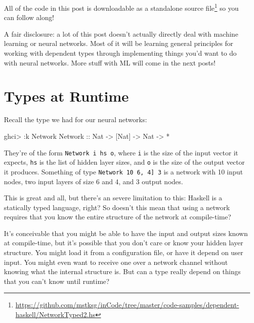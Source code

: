 \documentclass[]{article}
\newenvironment{Shaded}{}{}
\newcommand{\DataTypeTok}[1]{\textcolor[rgb]{0.56,0.13,0.00}{#1}}
\newcommand{\FunctionTok}[1]{\textcolor[rgb]{0.02,0.16,0.49}{#1}}
\newcommand{\NormalTok}[1]{#1}
\newcommand{\OtherTok}[1]{\textcolor[rgb]{0.00,0.44,0.13}{#1}}
\renewcommand{\href}[2]{#2\footnote{\url{#1}}}
\begin{document}
All of the code in this post is
\href{https://github.com/mstksg/inCode/tree/master/code-samples/dependent-haskell/NetworkTyped2.hs}{downloadable
as a standalone source file} so you can follow along!

A fair disclosure: a lot of this post doesn't actually directly deal with
machine learning or neural networks. Most of it will be learning general
principles for working with dependent types through implementing things you'd
want to do with neural networks. More stuff with ML will come in the next posts!

\hypertarget{types-at-runtime}{%
\section{Types at Runtime}\label{types-at-runtime}}

Recall the type we had for our neural networks:

\begin{Shaded}
\begin{Highlighting}[]
\NormalTok{ghci}\FunctionTok{>} \FunctionTok{:}\NormalTok{k }\DataTypeTok{Network}
\DataTypeTok{Network}\OtherTok{ ::} \DataTypeTok{Nat} \OtherTok{->}\NormalTok{ [}\DataTypeTok{Nat}\NormalTok{] }\OtherTok{->} \DataTypeTok{Nat} \OtherTok{->} \FunctionTok{*}
\end{Highlighting}
\end{Shaded}

They're of the form \texttt{Network\ i\ hs\ o}, where \texttt{i} is the size of
the input vector it expects, \texttt{hs} is the list of hidden layer sizes, and
\texttt{o} is the size of the output vector it produces. Something of type
\texttt{Network\ 10\ \textquotesingle{}{[}6,\ 4{]}\ 3} is a network with 10
input nodes, two input layers of size 6 and 4, and 3 output nodes.

This is great and all, but there's an severe limitation to this: Haskell is a
statically typed language, right? So doesn't this mean that using a network
requires that you know the entire structure of the network at compile-time?

It's conceivable that you might be able to have the input and output sizes known
at compile-time, but it's possible that you don't care or know your hidden layer
structure. You might load it from a configuration file, or have it depend on
user input. You might even want to receive one over a network channel without
knowing what the internal structure is. But can a type really depend on things
that you can't know until runtime?
\end{document}
